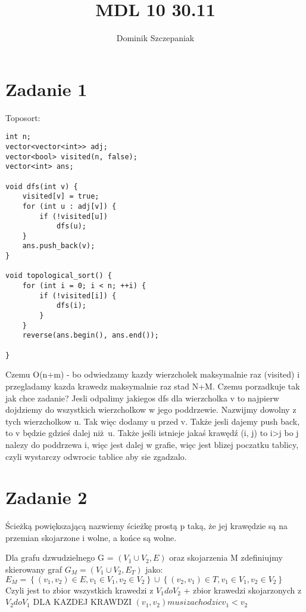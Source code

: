 \documentclass[12pt]{article}
\title{MDL 10 30.11}
\author{Dominik Szczepaniak}
\newcommand{\set}[1]{\left \{ #1 \right \}}				%
\begin{document}
\maketitle

\bgroup\obeylines
\section{Zadanie 1}  %
Toposort:
\begin{lstlisting}
int n; 
vector<vector<int>> adj; 
vector<bool> visited(n, false); 
vector<int> ans;

void dfs(int v) {
    visited[v] = true;
    for (int u : adj[v]) {
        if (!visited[u])
            dfs(u);
    }
    ans.push_back(v);
}

void topological_sort() {
    for (int i = 0; i < n; ++i) {
        if (!visited[i]) {
            dfs(i);
        }
    }
    reverse(ans.begin(), ans.end());
    
}
\end{lstlisting}
Czemu O(n+m) - bo odwiedzamy kazdy wierzcholek maksymalnie raz (visited) i przegladamy kazda krawedz maksymalnie raz stad N+M.
Czemu porzadkuje tak jak chce zadanie?
Jesli odpalimy jakiegos dfs dla wierzcholka v to najpierw dojdziemy do wszystkich wierzcholkow w jego poddrzewie. Nazwijmy dowolny z tych wierzcholkow u. Tak więc dodamy u przed v. Także jesli dajemy push back, to v będzie gdzieś dalej niż u. Także jeśli istnieje jakaś krawędź (i, j) to i>j bo j nalezy do poddrzewa i, więc jest dalej w grafie, więc jest blizej poczatku tablicy, czyli wystarczy odwrocic tablice aby sie zgadzalo.

\section{Zadanie 2} %

Ścieżką powiększającą nazwiemy ścieżkę prostą p taką, że jej krawędzie są na przemian skojarzone i wolne, a końce są wolne.

Dla grafu dzwudzielnego G = $(V_1 \cup V_2, E)$ oraz skojarzenia M zdefiniujmy skierowany graf $G_M = (V_1 \cup V_2, E_T)$ jako:
$E_M = \set{(v_1, v_2) \in E, v_1 \in V_1, v_2 \in V_2} \cup \set{(v_2, v_1) \in T, v_1 \in V_1, v_2 \in V_2}$
Czyli jest to zbior wszystkich krawedzi z $V_1 do V_2$ + zbior krawedzi skojarzonych z $V_2 do V_1$
DLA KAZDEJ KRAWDZI $(v_1, v_2) musi zachodzic v_1 < v_2$
\end{document}
